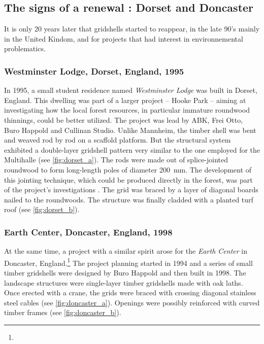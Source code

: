 \subsection{The signs of a renewal : Dorset and Doncaster}\label{sec:signs}

It is only 20 years later that gridshells started to reappear, in the late 90's mainly in the United Kindom, and for projects that had interest in environnemental problematics.

\subsubsection{Westminster Lodge, Dorset, England, 1995}
In 1995, a small student residence named \emph{Westminster Lodge} was built in Dorset, England. This dwelling was part of a larger project -- Hooke Park -- aiming at investigating how the local forest resources, in particular immature roundwood  thinnings, could be better utilized. The project was lead by ABK, Frei Otto, Buro Happold and Cullinan Studio. Unlike Mannheim, the timber shell was bent and weaved rod by rod on a scaffold platform. But the structural system exhibited a double-layer gridshell pattern very similar to the one employed for the Multihalle (see \cref{fig:dorset_a}). The rods were made out of splice-jointed roundwood to form long-length poles of diameter \SI{200}{mm}. The development of this jointing technique, which could be produced directly in the forest, was part of the project's investigations \cite{Burton1998}. The grid was braced by a layer of diagonal boards nailed to the roundwoods. The structure was finally cladded with a planted turf roof (see \cref{fig:dorset_b}).

\subsubsection{Earth Center, Doncaster, England, 1998}
At the same time, a project with a similar spirit arose for the \emph{Earth Center} in Doncaster, England.\footnote{} The project planning started in 1994 and a series of small timber gridshells were designed by Buro Happold and then built in 1998. The landscape structures were single-layer timber gridshells made with oak laths. Once erected with a crane, the grids were braced with crossing diagonal stainless steel cables (see \cref{fig:doncaster_a}). Openings were possibly reinforced with curved timber frames (see \cref{fig:doncaster_b}).

